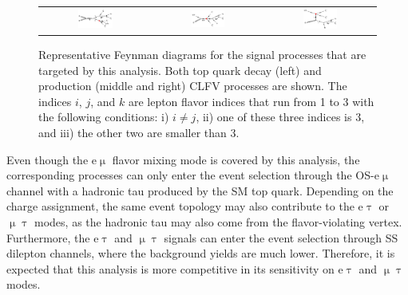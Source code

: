  \begin{figure}[tbh!]
 \begin{center}
 \begin{tabular}{ccc}
 \includegraphics[width=0.33\textwidth]{figures/Part4/Signal/TT}&
 \includegraphics[width=0.33\textwidth]{figures/Part4/Signal/ST1}&
 \includegraphics[width=0.33\textwidth]{figures/Part4/Signal/ST2}\\
 \end{tabular}
 \caption{Representative Feynman diagrams for the signal processes that are targeted by this analysis. Both top quark decay (left) and production (middle and right) \ac{CLFV} processes are shown. The indices $i$,  $j$, and $k$ are lepton flavor indices that run from 1 to 3 with the following conditions: i) $i\neq j$, ii) one of these three indices is 3, and iii) the other two are smaller than 3.}
 \label{fig:Target}
 \end{center}
 \end{figure}

Even though the e$\upmu$ flavor mixing mode is covered by this analysis, the corresponding processes can only enter the event selection through the \ac{OS}-e$\upmu$ channel with a hadronic tau produced by the \ac{SM} top quark. Depending on the charge assignment, the same event topology may also contribute to the e$\uptau$ or $\upmu\uptau$ modes, as the hadronic tau may also come from the flavor-violating vertex. Furthermore, the e$\uptau$ and $\upmu\uptau$ signals can enter the event selection through \ac{SS} dilepton channels, where the background yields are much lower. Therefore, it is expected that this analysis is more competitive in its sensitivity on e$\uptau$ and $\upmu\uptau$ modes.
